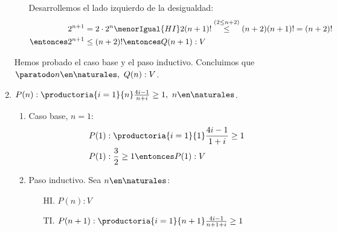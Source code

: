 \begin{enumerate}[label=\roman*)]
\begin{enumerate}[label=\arabic*)]
                Desarrollemos el lado izquierdo de la desigualdad:
                \begin{align*}
                  2^{n+1}          & = 2 \cdot 2^n \menorIgual{HI} 2 (n+1)! \overset{(2\leq n+2)}{\leq} (n+2)(n+1)! = (n+2)! \\
                  \entonces 2^{n+1} & \leq (n+2)! \entonces Q(n+1):V
                \end{align*}
        \end{enumerate}

        Hemos probado el caso base y el paso inductivo. Concluimos que $\paratodo n \en \naturales, \ Q(n): V$.


  \item $P(n):  \productoria{i=1}{n}\frac{4i-1}{n+i} \geq 1, \ n \en \naturales$.
        \begin{enumerate}[label=\arabic*)]
          \item Caso base, $n = 1$:
                \begin{align*}
                  P(1) & : \productoria{i=1}{1} \frac{4i-1}{1+i} \geq 1 \\
                  P(1) & : \frac{3}{2} \geq 1 \entonces P(1): V
                \end{align*}
          \item Paso inductivo. Sea $n \en \naturales$:
                \begin{enumerate}
                  \item[HI.] $P(n): V$
                  \item[TI.] $P(n+1):  \productoria{i=1}{n+1} \frac{4i-1}{n+1+i} \geq 1 $
                \end{enumerate}


\end{enumerate}
\end{enumerate}
